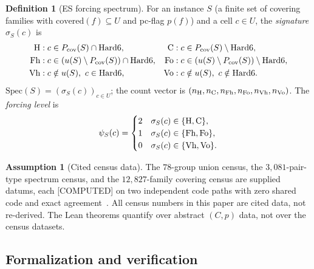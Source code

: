 \documentclass[11pt,a4paper]{article}
\theoremstyle{definition}
\newtheorem{assumption}{Assumption}
\newtheorem{definition}{Definition}
\newcommand{\cH}{\textnormal{H}}
\newcommand{\cC}{\textnormal{C}}
\newcommand{\cFh}{\textnormal{Fh}}
\newcommand{\cFo}{\textnormal{Fo}}
\newcommand{\cVh}{\textnormal{Vh}}
\newcommand{\cVo}{\textnormal{Vo}}
\begin{document}
\begin{definition}[ES forcing spectrum]
  \label{def:spectrum}
  For an instance $S$ (a finite set of covering families with
  $\mathrm{covered}(f)\subseteq U$ and pc-flag $p(f)$) and a cell $c\in U$,
  the \emph{signature} $\sigma_S(c)$ is
  \begin{equation}
    \label{eq:sig}
    \begin{aligned}
      \cH &: c\in P_{\mathrm{cov}}(S)\cap\text{Hard6}, &
      \cC &: c\in P_{\mathrm{cov}}(S)\setminus\text{Hard6},\\
      \cFh &: c\in (u(S)\setminus P_{\mathrm{cov}}(S))\cap\text{Hard6}, &
      \cFo &: c\in (u(S)\setminus P_{\mathrm{cov}}(S))\setminus\text{Hard6},\\
      \cVh &: c\notin u(S),\ c\in\text{Hard6}, &
      \cVo &: c\notin u(S),\ c\notin\text{Hard6}.
    \end{aligned}
  \end{equation}
  $\mathrm{Spec}(S)=(\sigma_S(c))_{c\in U}$; the count vector is
  $(n_{\cH},n_{\cC},n_{\cFh},n_{\cFo},n_{\cVh},n_{\cVo})$.
  The \emph{forcing level} is
  \begin{equation}
    \label{eq:psi}
    \psi_S(c)=
    \begin{cases}
      2 & \sigma_S(c)\in\{\cH,\cC\},\\
      1 & \sigma_S(c)\in\{\cFh,\cFo\},\\
      0 & \sigma_S(c)\in\{\cVh,\cVo\}.
    \end{cases}
  \end{equation}
\end{definition}

\begin{assumption}[Cited census data]
  \label{asm:census}
  The $78$-group union census, the $3{,}081$-pair-type spectrum census, and
  the $12{,}827$-family covering census are supplied datums, each
  [COMPUTED] on two independent code paths with zero shared code and exact
  agreement~\cite{D304,D313,D322}.  All census numbers in this paper are
  cited data, not re-derived.  The Lean theorems quantify over abstract
  $(C,p)$ data, not over the census datasets.
\end{assumption}

\subsection{Formalization and verification}
\label{sec:formal}
\end{document}
